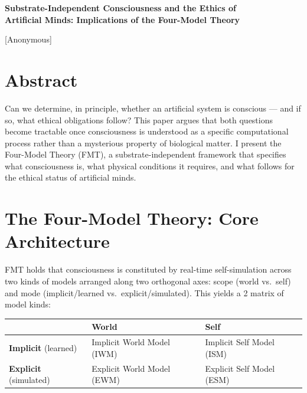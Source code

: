 \documentclass[11pt,a4paper]{article}
\begin{document}
\begin{center}
{\Large\bfseries Substrate-Independent Consciousness and the Ethics of\\[4pt]
Artificial Minds: Implications of the Four-Model Theory}

\vspace{12pt}
{[Anonymous]}
\end{center}

\vspace{8pt}

\section*{Abstract}

Can we determine, in principle, whether an artificial system is conscious --- and if so, what ethical obligations follow? This paper argues that both questions become tractable once consciousness is understood as a specific computational process rather than a mysterious property of biological matter. I present the Four-Model Theory (FMT), a substrate-independent framework that specifies what consciousness is, what physical conditions it requires, and what follows for the ethical status of artificial minds.

\section{The Four-Model Theory: Core Architecture}

FMT holds that consciousness is constituted by real-time self-simulation across two kinds of models arranged along two orthogonal axes: scope (world vs.\ self) and mode (implicit/learned vs.\ explicit/simulated). This yields a 2 matrix of model kinds:

\begin{table}[h]
\centering
\begin{tabular}{>{\raggedright\arraybackslash}p{3.2cm} >{\raggedright\arraybackslash}p{4.5cm} >{\raggedright\arraybackslash}p{4.5cm}}
\toprule
 & \textbf{World} & \textbf{Self} \\
\midrule
\textbf{Implicit} (learned) & Implicit World Model (IWM) & Implicit Self Model (ISM) \\[4pt]
\textbf{Explicit} (simulated) & Explicit World Model (EWM) & Explicit Self Model (ESM) \\
\bottomrule
\end{tabular}
\end{table}
\end{document}
